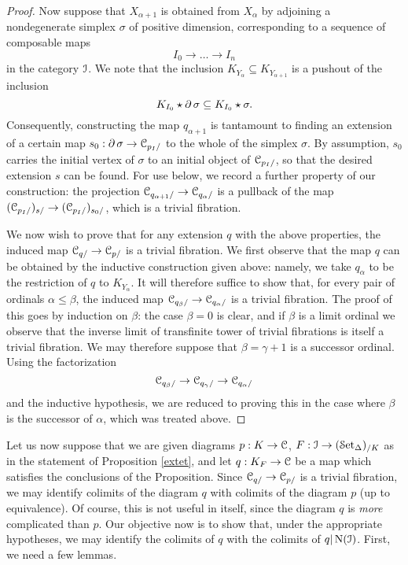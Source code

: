 \begin{proof}
Now suppose that $X_{\alpha+1}$ is obtained from $X_{\alpha}$ by
adjoining a nondegenerate simplex $\sigma$ of positive dimension, corresponding
to a sequence of composable maps
$$ I_0 \rightarrow \ldots \rightarrow I_n$$
in the category $\operatorname{\mathcal{I}}$. We
note that the inclusion $K_{Y_{\alpha}} \subseteq
K_{Y_{\alpha+1}}$ is a pushout of the inclusion
$$ K_{I_0} \star \operatorname{\partial} \sigma \subseteq K_{I_0} \star \sigma.$$
Consequently, constructing the map $q_{\alpha+1}$ is tantamount to
finding an extension of a certain map $s_0: \operatorname{\partial} \sigma \rightarrow \operatorname{\mathcal{C}}_{p_I/}$ to the whole of the simplex $\sigma$. By assumption, $s_0$ carries the initial vertex of $\sigma$ to an initial
object of $\operatorname{\mathcal{C}}_{p_I/}$, so that the desired extension $s$ can be found. For use below, we record
a further property of our construction: the projection $\operatorname{\mathcal{C}}_{q_{\alpha+1}/} \rightarrow \operatorname{\mathcal{C}}_{q_{\alpha}/}$ is a pullback of the map $( \operatorname{\mathcal{C}}_{ p_I/} )_{s/} \rightarrow (\operatorname{\mathcal{C}}_{p_I/})_{s_0/}$, which is a trivial fibration.

We now wish to prove that for any extension $q$ with the above properties, the induced map
$\operatorname{\mathcal{C}}_{q/} \rightarrow \operatorname{\mathcal{C}}_{p/}$ is a trivial fibration. We first observe that the map $q$ can be obtained by the inductive construction given above: namely, we take $q_{\alpha}$ to be
the restriction of $q$ to $K_{Y_{\alpha}}$. It will therefore suffice to show that, for every pair of ordinals $\alpha \leq \beta$, the induced map $\operatorname{\mathcal{C}}_{q_{\beta}/} \rightarrow \operatorname{\mathcal{C}}_{q_{\alpha}/}$ is a trivial fibration. The proof of this goes by induction on $\beta$: the case $\beta = 0$ is clear, and if $\beta$ is a limit ordinal we observe that the inverse limit of transfinite tower of trivial fibrations is itself a trivial fibration. We may therefore suppose that $\beta = \gamma + 1$ is a successor ordinal.
Using the factorization
$$ \operatorname{\mathcal{C}}_{q_{\beta}/} \rightarrow \operatorname{\mathcal{C}}_{q_{\gamma}/} \rightarrow \operatorname{\mathcal{C}}_{q_{\alpha}/}$$
and the inductive hypothesis, we are reduced to proving this in the case where $\beta$ is the successor of $\alpha$, which was treated above.
\end{proof}

Let us now suppose that we are given diagrams $p: K \rightarrow \operatorname{\mathcal{C}}$, $F: \operatorname{\mathcal{I}} \rightarrow (\operatorname{\mathcal{S}et_{\Delta}})_{/K}$ as in the statement of Proposition \ref{extet}, and let $q: K_{F} \rightarrow \operatorname{\mathcal{C}}$ be a map which satisfies the conclusions of the Proposition. Since $\operatorname{\mathcal{C}}_{q/} \rightarrow \operatorname{\mathcal{C}}_{p/}$ is a trivial fibration, we may identify colimits of the diagram $q$ with colimits of the diagram $p$ (up to equivalence). Of course, this is not useful in itself,
since the diagram $q$ is {\em more} complicated than $p$. Our objective
now is to show that, under the appropriate hypotheses, we may
identify the colimits of $q$ with the colimits of $q|\operatorname{N}(\operatorname{\mathcal{I}})$.
First, we need a few lemmas.

